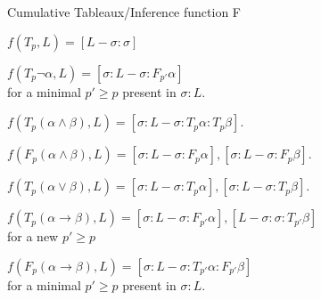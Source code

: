 \documentclass{beamer}
\begin{document}
\begin{frame}{Cumulative Tableaux/Inference function F}
    \scriptsize{
    \begin{itemize}

        \item\textcolor{black!30}{ $f(T_{p} ,L) = [L - \sigma: \sigma ] $ 
        \item $f(T_{p} \neg \alpha,L) = [\sigma :L - \sigma: F_{p'}\alpha] $ \\for a minimal $p' \geq p$ present in $\sigma:L$.
        \textcolor{black}{} 
        \item $f(T_{p} (\alpha \land \beta), L) = [\sigma :L - \sigma: T_{p} \alpha : T_{p} \beta]$.
        \item $f(F_{p} (\alpha \land \beta), L) = [\sigma :L - \sigma: F_{p} \alpha],[ \sigma :L - \sigma: F_{p} \beta]$.
        \item $f(T_{p} (\alpha \lor \beta), L) = [\sigma :L - \sigma: T_{p} \alpha],[ \sigma :L - \sigma: T_{p} \beta]$.
        \textcolor{black}{}
        \item $f(T_{p} (\alpha \to \beta), L) = [\sigma :L - \sigma: F_{p'} \alpha],[ L - \sigma : \sigma : T_{p'} \beta]$ \\for a new $p' \geq p$ 
        \item $f(F_{p} (\alpha \to \beta), L) = [\sigma :L - \sigma: T_{p'} \alpha : F_{p'} \beta]$ \\for a minimal $p' \geq p$ present in $\sigma:L$.}
    \end{itemize} 
    }
\end{frame}
\end{document}
